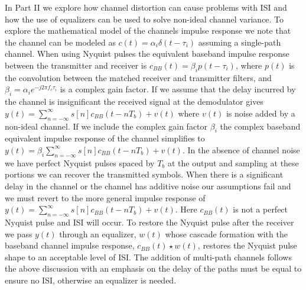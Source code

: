 In Part II we explore how channel distortion can cause problems with ISI and how the use of equalizers can be used to solve non-ideal channel variance. To explore the mathematical model of the channels impulse response we note that the channel can be modeled as $c(t) = {\alpha}_i \delta (t-{\tau}_i)$ assuming a single-path channel. When using Nyquist pulses the equivalent baseband impulse response between the transmitter and receiver is $c_{BB}(t) = {\beta}_i p(t-{\tau}_i)$, where $p(t)$ is the convolution between the matched receiver and transmitter filters, and ${\beta}_i={\alpha}_i e^{-j2\pi f_c {\tau}_i}$ is a complex gain factor. If we assume that the delay incurred by the channel is insignificant the received signal at the demodulator gives $y(t) = \sum_{n=-\infty}^{\infty} s[n]c_{BB}(t -nT_b) + v(t)$ where $v(t)$ is noise added by a non-ideal channel. If we include the complex gain factor ${\beta}_i$ the complex baseband equivalent impulse response of the channel simplifies to $y(t) = {\beta}_i \sum_{n=-\infty}^{\infty} s[n]c_{BB}(t -nT_b) + v(t)$. In the absence of channel noise we have perfect Nyquist pulses spaced by $T_b$ at the output and sampling at these portions we can recover the transmitted symbols. When there is a significant delay in the channel or the channel has additive noise our assumptions fail and we must revert to the more general impulse response of $y(t) = \sum_{n=-\infty}^{\infty} s[n]c_{BB}(t -nT_b) + v(t)$. Here $c_{BB}(t)$ is not a perfect Nyquist pulse and ISI will occur. To restore the Nyquist pulse after the receiver we pass $y(t)$ through an equalizer, $w(t)$ whose cascade formation with the baseband channel impulse response, $c_{BB}(t) \star w(t)$, restores the Nyquist pulse shape to an acceptable level of ISI. The addition of multi-path channels follows the above discussion with an emphasis on the delay of the paths must be equal to ensure no ISI, otherwise an equalizer is needed.

